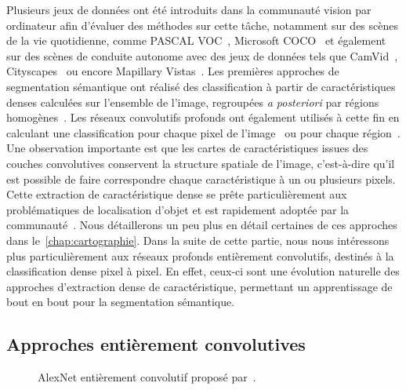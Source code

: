 Plusieurs jeux de données ont été introduits dans la communauté vision par ordinateur afin d'évaluer des méthodes sur cette tâche, notamment sur des scènes de la vie quotidienne, comme PASCAL VOC~\cite{everingham_pascal_2014}, Microsoft COCO~\cite{lin_microsoft_2014} et également sur des scènes de conduite autonome avec des jeux de données tels que CamVid~\cite{brostow_semantic_2009}, Cityscapes~\cite{cordts_cityscapes_2016} ou encore Mapillary Vistas~\cite{neuhold_mapillary_2017}. Les premières approches de segmentation sémantique ont réalisé des classification à partir de caractéristiques denses calculées sur l'ensemble de l'image, regroupées \emph{a posteriori} par régions homogènes~\cite{shotton_semantic_2008,shotton_real-time_2011}. Les réseaux convolutifs profonds ont également utilisés à cette fin en calculant une classification pour chaque pixel de l'image~\cite{grangier_deep_2009,ciresan_deep_2012} ou pour chaque région~\cite{farabet_towards_2013,sermanet_overfeat_2013}. Une observation importante est que les cartes de caractéristiques issues des couches convolutives conservent la structure spatiale de l'image, c'est-à-dire qu'il est possible de faire correspondre chaque caractéristique à un ou plusieurs pixels. Cette extraction de caractéristique dense se prête particulièrement aux problématiques de localisation d'objet et est rapidement adoptée par la communauté~\cite{zou_generic_2014}. Nous détaillerons un peu plus en détail certaines de ces approches dans le~\cref{chap:cartographie}. Dans la suite de cette partie, nous nous intéressons plus particulièrement aux réseaux profonds entièrement convolutifs, destinés à la classification dense pixel à pixel. En effet, ceux-ci sont une évolution naturelle des approches d'extraction dense de caractéristique, permettant un apprentissage de bout en bout pour la segmentation sémantique.

\subsection{Approches entièrement convolutives}

\begin{figure}
  \resizebox{\textwidth}{!}{%
  
  }
  \caption{AlexNet entièrement convolutif proposé par~\citet{long_fully_2015}.}
\end{figure}



